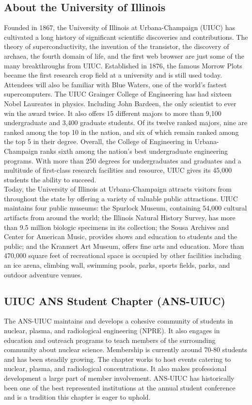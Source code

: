 \documentclass[11pt, letterpaper]{article}
\begin{document}
\subsection{About the University of Illinois}
Founded in 1867, the University of Illinois at Urbana-Champaign (UIUC) has cultivated a long history of significant scientific discoveries and contributions. The theory of superconductivity, the invention of the transistor, the discovery of archaea, the fourth domain of life, and the first web browser are just some of the many breakthroughs from UIUC. Established in 1876, the famous Morrow Plots became the first research crop field at a university and is still used today. Attendees will also be familiar with Blue Waters, one of the world’s fastest supercomputers. 
The UIUC Grainger College of Engineering has had sixteen Nobel Laureates in physics. Including John Bardeen, the only scientist to ever win the award twice. It also offers 15 different majors to more than 9,100 undergraduate and 3,400 graduate students. Of its twelve ranked majors, nine are ranked among the top 10 in the nation, and six of which remain ranked among the top 5 in their degree. Overall, the College of Engineering in Urbana-Champaign ranks sixth among the nation’s best undergraduate engineering programs. With more than 250 degrees for undergraduates and graduates and a multitude of first-class research facilities and resource, UIUC gives its 45,000 students the ability to succeed.\\
Today, the University of Illinois at Urbana-Champaign attracts visitors from throughout the state by offering a variety of valuable public attractions. UIUC maintains four public museums: the Spurlock Museum, containing 54,000 cultural artifacts from around the world; the Illinois Natural History Survey, has more than 9.5 million biologic specimens in its collection; the Sousa Archives and Center for American Music, provides shows and education to students and the public; and the Krannert Art Museum, offers fine arts and education. More than 470,000 square feet of recreational space is occupied by other facilities including an ice arena, climbing wall, swimming pools, parks, sports fields, parks, and outdoor adventure venues. 

\subsection{UIUC ANS Student Chapter (ANS-UIUC)}
The ANS-UIUC maintains and develops a cohesive community of students in nuclear, plasma, and radiological engineering (NPRE). It also engages in education and outreach programs to teach members of the surrounding community about nuclear science. Membership is currently around 70-80 students and has been steadily growing. The chapter works to host events catering to nuclear, plasma, and radiological concentrations. It also makes professional development a large part of member involvement. ANS-UIUC has historically been one of the best represented institutions at the annual student conference and is a tradition this chapter is eager to uphold. 
\end{document}
